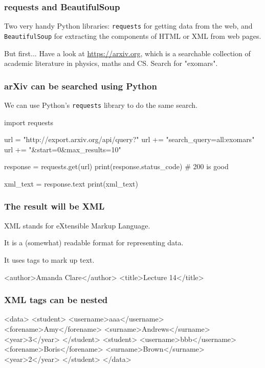 \documentclass{beamer}
\begin{document}
\begin{frame}[fragile]
\frametitle{requests and BeautifulSoup}
Two very handy Python libraries: \texttt{requests} for getting data
from the web, and \texttt{BeautifulSoup} for extracting the components
of HTML or XML from web pages.

\bigskip

But first... Have a look at \url{https://arxiv.org}, which is a searchable
collection of academic literature in physics, maths and CS.  Search
for "exomars".
\end{frame}

\begin{frame}[fragile]
\frametitle{arXiv can be searched using Python}
We can use Python's \texttt{requests} library to do the same search.
\begin{code}
import requests

url = "http://export.arxiv.org/api/query?" 
url += "search_query=all:exomars" 
url += "&start=0&max_results=10"

response = requests.get(url)
print(response.status_code) # 200 is good

xml_text = response.text
print(xml_text)
\end{code}
\end{frame}

\begin{frame}[fragile]
\frametitle{The result will be XML}
XML stands for eXtensible Markup Language.

It is a (somewhat) readable format for representing data.

It uses tags to mark up text.

\bigskip

\begin{code}
<author>Amanda Clare</author>
<title>Lecture 14</title>
\end{code} 
\end{frame}

\begin{frame}[fragile]
\frametitle{XML tags can be nested}

\begin{code}
<data>
    <student>
        <username>aaa</username>
        <forename>Amy</forename>
        <surname>Andrews</surname>
        <year>3</year>
    </student>
    <student>
        <username>bbb</username>
        <forename>Boris</forename>
        <surname>Brown</surname>
        <year>2</year>
    </student>
</data>\end{code} 
\end{frame}
\end{document}
